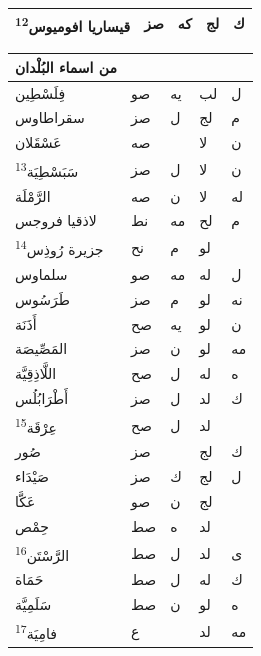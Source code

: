 \documentclass[11pt]{article}
\newcommand{\AbjadZero}{{\NallinoSigns\symbol{"E000}}}
\begin{document}
\begin{Arabic}
\begin{minipage}[t]{0.495\textwidth}
\begin{tabular}{|p{55mm}|>{\centering\arraybackslash}p{4.8mm}>{\centering\arraybackslash}p{4.8mm}|>{\centering\arraybackslash}p{4.8mm}>{\centering\arraybackslash}p{4.8mm}|}
{}قيساريا افوميوس\textsuperscript{12} & صز & كه & لج & ك \\
\hline\end{tabular}\end{minipage}\hfill\begin{minipage}[t]{0.495\textwidth}\setlength{\tabcolsep}{2.2pt}\begin{tabular}{|p{55mm}|>{\centering\arraybackslash}p{4.8mm}>{\centering\arraybackslash}p{4.8mm}|>{\centering\arraybackslash}p{4.8mm}>{\centering\arraybackslash}p{4.8mm}|}\hline
\centering من اسماء البُلْدان & \multicolumn{2}{c|}{الطول} & \multicolumn{2}{c|}{العرض} \\ \hline
{}فِلَسْطِين & صو & يه & لب & ل \\
{}سقراطاوس & صز & ل & لج & م \\
{}عَسْقَلان & صه &  & لا & ن \\
{}سَبَسْطِيَة\textsuperscript{13} & صز & ل & لا & ن \\
{}الرَّمْلَة & صه & ن & لا & له \\
{}لاذقيا فروجس & نط & مه & لح & م \\
{}جزيرة رُوذِس\textsuperscript{14} & نح & م & لو & \AbjadZero{} \\
{}سلماوس & صو & مه & له & ل \\
{}طَرَسُوس & صز & م & لو & نه \\
{}أَذَنَة & صح & يه & لو & ن \\
{}المَصِّيصَة & صز & ن & لو & مه \\
{}اللَّاذِقِيَّة & صح & ل & له & ه \\
{}أَطْرَابُلُس & صز & ل & لد & ك \\
{}عِرْقَة\textsuperscript{15} & صح & ل & لد & \AbjadZero{} \\
{}صُور & صز & \AbjadZero{} & لج & ك \\
{}صَيْدَاء & صز & ك & لج & ل \\
{}عَكَّا & صو & ن & لج & \AbjadZero{} \\
{}حِمْص & صط & ه & لد & \AbjadZero{} \\
{}الرَّسْتَن\textsuperscript{16} & صط & ل & لد & ى \\
{}حَمَاة & صط & ل & له & ك \\
{}سَلَمِيَّة & صط & ن & لو & ه \\
{}فامِيَة\textsuperscript{17} & ع & \AbjadZero{} & لد & مه \\
\hline\end{tabular}\end{minipage}
\end{Arabic}
\end{document}
